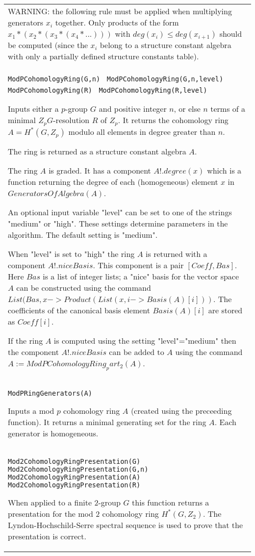 \documentclass[a4paper,11pt]{report}
\begin{document}
{\begin{center}
\begin{tabular}{|l|}
 WARNING: the following rule must be applied when multiplying generators $x_i$ together. Only products of the form $x_1*(x_2*(x_3*(x_4*...)))$ with $deg(x_i) \le deg(x_{i+1})$ should be computed (since the $x_i$ belong to a structure constant algebra with only a partially defined structure
constants table). \\
 \index{ModPCohomologyRing} \texttt{ModPCohomologyRing(G,n) } \texttt{ModPCohomologyRing(G,n,level) } \texttt{ModPCohomologyRing(R) } \texttt{ModPCohomologyRing(R,level)} 

 Inputs either a $p$-group $G$ and positive integer $n$, or else $n$ terms of a minimal $Z_pG$-resolution $R$ of $Z_p$. It returns the cohomology ring $A=H^*(G,Z_p)$ modulo all elements in degree greater than $n$. 

 The ring is returned as a structure constant algebra $A$. 

 The ring $A$ is graded. It has a component $A!.degree(x)$ which is a function returning the degree of each (homogeneous) element $x$ in $GeneratorsOfAlgebra(A)$. 

 An optional input variable "level" can be set to one of the strings "medium"
or "high". These settings determine parameters in the algorithm. The default
setting is "medium". 

 When "level" is set to "high" the ring $A$ is returned with a component $A!.niceBasis$. This component is a pair $[Coeff,Bas]$. Here $Bas$ is a list of integer lists; a "nice" basis for the vector space $A$ can be constructed using the command $List(Bas,x->Product(List(x,i->Basis(A)[i]))$. The coefficients of the canonical basis element $Basis(A)[i]$ are stored as $Coeff[i]$. 

 If the ring $A$ is computed using the setting "level"="medium" then the component $A!.niceBasis$ can be added to $A$ using the command $ A:=ModPCohomologyRing_part_2(A) $. \\
 \index{ModPRingGenerators} \texttt{ModPRingGenerators(A) } 

 Inputs a mod $p$ cohomology ring $A$ (created using the preceeding function). It returns a minimal generating set
for the ring $A$. Each generator is homogeneous. \\
 \texttt{Mod2CohomologyRingPresentation(G) } \texttt{Mod2CohomologyRingPresentation(G,n) } \texttt{Mod2CohomologyRingPresentation(A) } \texttt{Mod2CohomologyRingPresentation(R)} 

 When applied to a finite $2$-group $G$ this function returns a presentation for the mod 2 cohomology ring $H^*(G,Z_2)$. The Lyndon-Hochschild-Serre spectral sequence is used to prove that the
presentation is correct. 


\end{tabular}
\end{center}}
\end{document}
